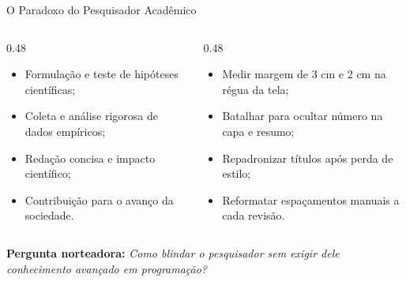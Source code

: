 \documentclass[aspectratio=169, 10pt]{beamer}
\begin{document}
\begin{frame}{O Paradoxo do Pesquisador Acadêmico}
  \begin{columns}[T]
    \begin{column}{0.48\textwidth}
      \begin{tcolorbox}[colback=iffgreenlight,colframe=iffprimary,arc=1.5mm,title=\textbf{O Objetivo Científico Central}]
        \scriptsize
        \begin{itemize}\setlength{\itemsep}{1.5pt}
          \item Formulação e teste de hipóteses científicas;
          \item Coleta e análise rigorosa de dados empíricos;
          \item Redação concisa e impacto científico;
          \item Contribuição para o avanço da sociedade.
        \end{itemize}
      \end{tcolorbox}
    \end{column}

    \begin{column}{0.48\textwidth}
      \begin{tcolorbox}[colback=iffalertbg,colframe=iffred,arc=1.5mm,title=\textbf{A Realidade Burocrática}]
        \scriptsize
        \begin{itemize}\setlength{\itemsep}{1.5pt}
          \item Medir margem de 3 cm e 2 cm na régua da tela;
          \item Batalhar para ocultar número na capa e resumo;
          \item Repadronizar títulos após perda de estilo;
          \item Reformatar espaçamentos manuais a cada revisão.
        \end{itemize}
      \end{tcolorbox}
    \end{column}
  \end{columns}
  \vspace{0.12cm}
  \centering \scriptsize \textbf{Pergunta norteadora:} \textit{Como blindar o pesquisador sem exigir dele conhecimento avançado em programação?}
\end{frame}

\end{document}
